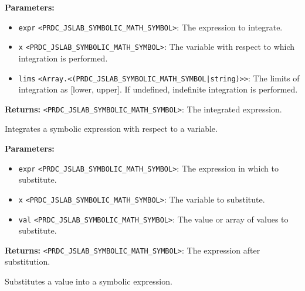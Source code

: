 \documentclass[12pt,a4paper]{article}
\begin{document}
\vspace{5mm}
\noindent {}


\noindent \textbf{Parameters:}
\begin{itemize}
  \item \texttt{expr} \texttt{<PRDC\_JSLAB\_SYMBOLIC\_MATH\_SYMBOL>}: The expression to integrate.
  \item \texttt{x} \texttt{<PRDC\_JSLAB\_SYMBOLIC\_MATH\_SYMBOL>}: The variable with respect to which integration is performed.
  \item \texttt{lims} \texttt{<Array.<(PRDC\_JSLAB\_SYMBOLIC\_MATH\_SYMBOL|string)>>}: The limits of integration as [lower, upper]. If undefined, indefinite integration is performed.
\end{itemize}

\noindent \textbf{Returns:} \texttt{<PRDC\_JSLAB\_SYMBOLIC\_MATH\_SYMBOL>}: The integrated expression.

\noindent Integrates a symbolic expression with respect to a variable.

\vspace{5mm}
\noindent {}


\noindent \textbf{Parameters:}
\begin{itemize}
  \item \texttt{expr} \texttt{<PRDC\_JSLAB\_SYMBOLIC\_MATH\_SYMBOL>}: The expression in which to substitute.
  \item \texttt{x} \texttt{<PRDC\_JSLAB\_SYMBOLIC\_MATH\_SYMBOL>}: The variable to substitute.
  \item \texttt{val} \texttt{<PRDC\_JSLAB\_SYMBOLIC\_MATH\_SYMBOL>}: The value or array of values to substitute.
\end{itemize}

\noindent \textbf{Returns:} \texttt{<PRDC\_JSLAB\_SYMBOLIC\_MATH\_SYMBOL>}: The expression after substitution.

\noindent Substitutes a value into a symbolic expression.

\vspace{5mm}
\noindent {}
\end{document}
